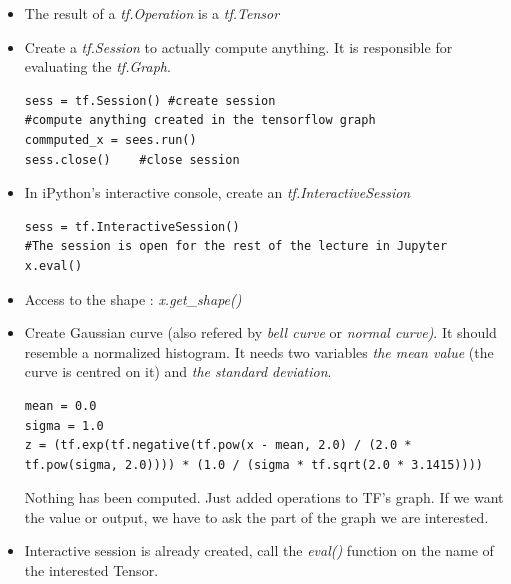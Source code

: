 \documentclass[12pt,a4paper]{article}
\begin{document}
\begin{itemize}
\begin{lstlisting}
tf.get_default_graph()
\end{lstlisting}
\begin{itemize}
\item Get the list of all added operation.
\begin{lstlisting}
[op.name for op in g.get_operations]
\end{lstlisting}
\end{itemize}
\item The result of a \textit{tf.Operation} is a \textit{tf.Tensor}
\item Create a \textit{tf.Session} to actually compute anything. It is responsible for evaluating the \textit{tf.Graph}.
\begin{lstlisting}
sess = tf.Session()	#create session
#compute anything created in the tensorflow graph
commputed_x = sees.run()
sess.close()	#close session
\end{lstlisting}
\item In iPython's interactive console, create an \textit{tf.InteractiveSession}
\begin{lstlisting}
sess = tf.InteractiveSession()
#The session is open for the rest of the lecture in Jupyter
x.eval()
\end{lstlisting}
\item Access to the shape : \textit{x.get\_shape()}
\item Create Gaussian curve (also refered by \textit{bell curve} or \textit{normal curve)}. It should resemble a normalized histogram. It needs two variables \textit{the mean value} (the curve is centred on it) and \textit{the standard deviation}.
\begin{lstlisting}
mean = 0.0
sigma = 1.0
z = (tf.exp(tf.negative(tf.pow(x - mean, 2.0) / (2.0 * tf.pow(sigma, 2.0)))) * (1.0 / (sigma * tf.sqrt(2.0 * 3.1415))))
\end{lstlisting}
Nothing has been computed. Just added operations to TF's graph. If we want the value or output, we have to ask the part of the graph we are interested. 
\item Interactive session is already created, call the \textit{eval()} function on the name of the  interested Tensor.
\end{itemize}
\end{document}

